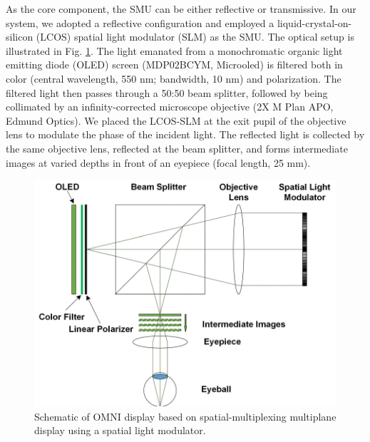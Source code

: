 \documentclass[9pt,twocolumn,twoside]{osajnl}
\begin{document}
As the core component, the SMU can be either reflective or transmissive. In our system, we adopted a reflective configuration and employed a liquid-crystal-on-silicon (LCOS) spatial light modulator (SLM) as the SMU. The optical setup is illustrated in Fig. \ref{fig:2}. The light emanated from a monochromatic organic light emitting diode (OLED) screen (MDP02BCYM, Microoled) is filtered both in color (central wavelength, 550 nm; bandwidth, 10 nm) and polarization. The filtered light then passes through a 50:50 beam splitter, followed by being collimated by an infinity-corrected microscope objective (2X M Plan APO, Edmund Optics). We placed the LCOS-SLM at the exit pupil of the objective lens to modulate the phase of the incident light. The reflected light is collected by the same objective lens, reflected at the beam splitter, and forms intermediate images at varied depths in front of an eyepiece (focal length, 25 mm).

\begin{figure}[htbp]
	\centering
	\includegraphics[width=\linewidth]{OMNIfig2}
	\caption{Schematic of OMNI display based on spatial-multiplexing multiplane display using a spatial light modulator.}
	\label{fig:2}
\end{figure}
\end{document}
